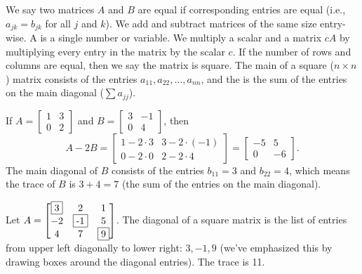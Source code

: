 We say two matrices {$A$} and {$B$} are equal if corresponding entries
are equal (i.e., {$a_{jk}=b_{jk}$} for all $j$ and $k$). We add and
subtract matrices of the same size entry-wise.  A  is a
single number or variable.  We multiply a scalar and a matrix $cA$ by multiplying every entry in the matrix by the scalar {$c$}. If the number of rows and columns are equal, then we say the matrix is square.  The main  of a square ({$n \times n$}) matrix consists of the entries {$a_{11},a_{22},\ldots,a_{nn}$}, and the  is the sum of the entries on the main diagonal ($\sum a_{jj}$).
\begin{example}
If $A=\begin{bmatrix}
1&3\\
0&2
\end{bmatrix}
$ and 
$B=
\begin{bmatrix}
3&-1\\
0&4
\end{bmatrix}
$, then $$A-2B
=\begin{bmatrix}
1-2\cdot3&3-2\cdot(-1)\\
0-2\cdot 0& 2-2\cdot 4
\end{bmatrix}
=\begin{bmatrix}
-5&5\\
0&-6
\end{bmatrix}.$$ The main diagonal of $B$ consists of the entries $b_{11} = 3$ and $b_{22}=4$, which means the trace of $B$ is $3+4=7$ (the sum of the entries on the main diagonal).
\end{example}

\begin{example}
Let $A=\begin{bmatrix}
\fbox{3}&2&1\\
-2&\fbox{-1}&5\\
4&7&\fbox{9}
\end{bmatrix}$.  The diagonal of a square matrix is the list of entries from upper left diagonally to lower right: $3,-1,9$ (we've emphasized this by drawing boxes around the diagonal entries).  The trace is 11.
\end{example}

